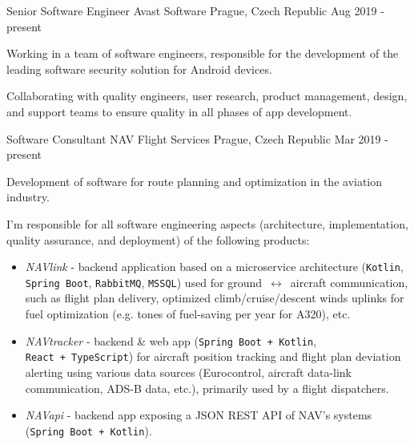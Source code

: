 \begin{cventries}
  
  \cventry
    {Senior Software Engineer}
    {Avast Software}
    {Prague, Czech Republic}
    {Aug 2019 - present}
    {
      \begin{cvitems}
        \item {Working in a team of software engineers, responsible for the development of the leading software security solution for Android devices.}
        \item {Collaborating with quality engineers, user research, product management, design, and support teams to ensure quality in all phases of app development.}
      \end{cvitems}
    }

    \cventry
    {Software Consultant}
    {NAV Flight Services}
    {Prague, Czech Republic}
    {Mar 2019 - present}
    {
      \begin{cvitems}
        \item {Development of software for route planning and optimization in the aviation industry.}
        \item I'm responsible for all software engineering aspects (architecture, implementation, quality assurance, and deployment) of the following products:
        \begin{itemize}
          \item \textit{NAVlink} - backend application based on a microservice architecture (\texttt{Kotlin}, \texttt{Spring Boot}, \texttt{RabbitMQ}, \texttt{MSSQL}) used for ground~$\leftrightarrow$~aircraft communication, such as flight plan delivery, optimized climb/cruise/descent winds uplinks for fuel optimization (e.g.  tones of fuel-saving per year for A320), etc.
          \item \textit{NAVtracker} - backend \& web app (\texttt{Spring Boot~+~Kotlin}, \texttt{React~+~TypeScript}) for aircraft position tracking and flight plan deviation alerting using various data sources (Eurocontrol, aircraft data-link communication, ADS-B data, etc.), primarily used by a flight dispatchers.
          \item \textit{NAVapi} - backend app exposing a JSON REST API of NAV's systems (\texttt{Spring Boot~+~Kotlin}).
        \end{itemize}
      \end{cvitems}
    }


\end{cventries}
